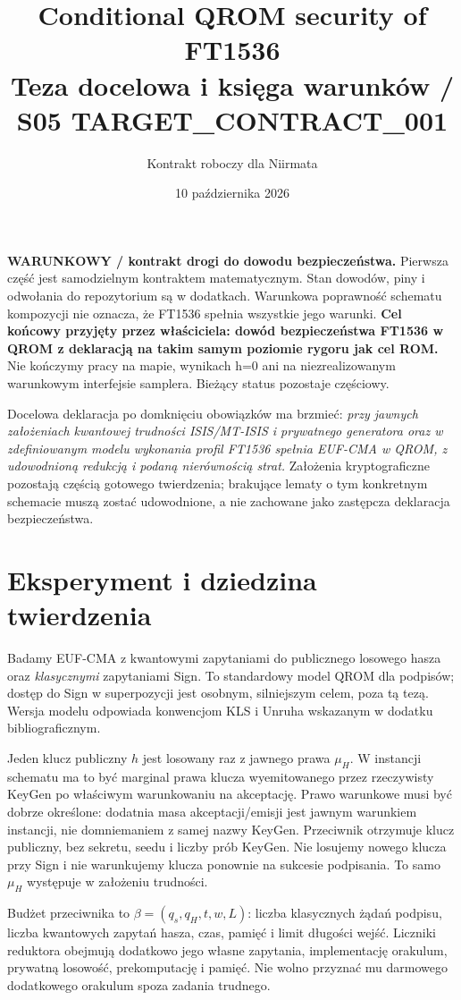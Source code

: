 \documentclass[11pt,a4paper]{article}
\title{Conditional QROM security of FT1536\\\large Teza docelowa i księga warunków / S05 TARGET\_CONTRACT\_001}
\author{Kontrakt roboczy dla Niirmata}\date{10 października 2026}
\begin{document}
\maketitle
\textbf{WARUNKOWY / kontrakt drogi do dowodu bezpieczeństwa.}
Pierwsza część jest samodzielnym kontraktem matematycznym. Stan dowodów,
piny i odwołania do repozytorium są w dodatkach. Warunkowa poprawność
schematu kompozycji nie oznacza, że FT1536 spełnia wszystkie jego warunki.
\textbf{Cel końcowy przyjęty przez właściciela: dowód bezpieczeństwa FT1536
w QROM z deklaracją na takim samym poziomie rygoru jak cel ROM.}
Nie kończymy pracy na mapie, wynikach h=0 ani na niezrealizowanym
warunkowym interfejsie samplera. Bieżący status pozostaje częściowy.

Docelowa deklaracja po domknięciu obowiązków ma brzmieć:
\emph{przy jawnych założeniach kwantowej trudności ISIS/MT-ISIS i prywatnego
generatora oraz w zdefiniowanym modelu wykonania profil FT1536 spełnia
EUF-CMA w QROM, z udowodnioną redukcją i podaną nierównością strat.}
Założenia kryptograficzne pozostają częścią gotowego twierdzenia;
brakujące lematy o tym konkretnym schemacie muszą zostać udowodnione,
a nie zachowane jako zastępcza deklaracja bezpieczeństwa.

\section{Eksperyment i dziedzina twierdzenia}
Badamy EUF-CMA z kwantowymi zapytaniami do publicznego losowego hasza
oraz \emph{klasycznymi} zapytaniami Sign. To standardowy model QROM dla
podpisów; dostęp do Sign w superpozycji jest osobnym, silniejszym celem,
poza tą tezą. Wersja modelu odpowiada konwencjom KLS i Unruha wskazanym
w dodatku bibliograficznym.

Jeden klucz publiczny $h$ jest losowany raz z jawnego prawa $\mu_H$.
W instancji schematu ma to być marginal prawa klucza wyemitowanego przez
rzeczywisty KeyGen po właściwym warunkowaniu na akceptację.
Prawo warunkowe musi być dobrze określone: dodatnia masa akceptacji/emisji
jest jawnym warunkiem instancji, nie domniemaniem z samej nazwy KeyGen.
Przeciwnik otrzymuje klucz publiczny, bez sekretu, seedu i liczby prób KeyGen.
Nie losujemy nowego klucza przy Sign i nie warunkujemy klucza ponownie
na sukcesie podpisania. To samo $\mu_H$ występuje w założeniu trudności.

Budżet przeciwnika to $\beta=(q_s,q_H,t,w,L)$: liczba klasycznych żądań
podpisu, liczba kwantowych zapytań hasza, czas, pamięć i limit długości
wejść. Liczniki reduktora obejmują dodatkowo jego własne zapytania,
implementację orakulum, prywatną losowość, prekomputację i pamięć.
Nie wolno przyznać mu darmowego dodatkowego orakulum spoza zadania trudnego.
\end{document}
